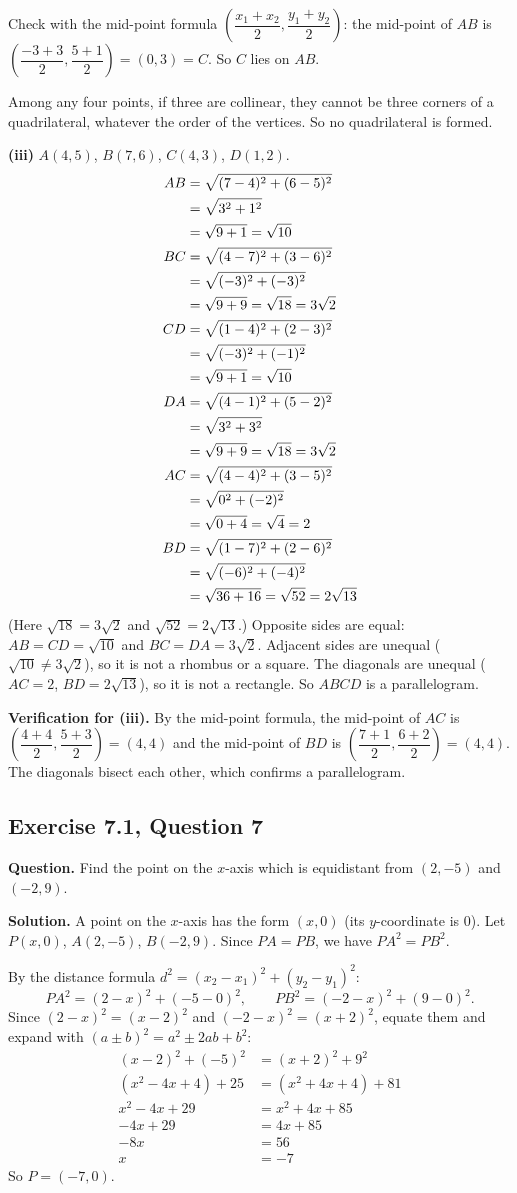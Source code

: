 Check with the mid-point formula $\left(\dfrac{x_1+x_2}{2},\dfrac{y_1+y_2}{2}\right)$: the mid-point of $AB$ is $\left(\dfrac{-3+3}{2},\dfrac{5+1}{2}\right)=(0,3)=C$. So $C$ lies on $AB$.

Among any four points, if three are collinear, they cannot be three corners of a quadrilateral, whatever the order of the vertices. So no quadrilateral is formed.

\textbf{(iii)} $A(4,5)$, $B(7,6)$, $C(4,3)$, $D(1,2)$.
\begin{align*}
\distn{AB}{4}{5}{7}{6}\\
\dist{BC}{7}{6}{4}{3}{3\sqrt2}\\
\distn{CD}{4}{3}{1}{2}\\
\dist{DA}{1}{2}{4}{5}{3\sqrt2}\\
\dist{AC}{4}{5}{4}{3}{2}\\
\dist{BD}{7}{6}{1}{2}{2\sqrt{13}}
\end{align*}
(Here $\sqrt{18}=3\sqrt2$ and $\sqrt{52}=2\sqrt{13}$.) Opposite sides are equal: $AB=CD=\sqrt{10}$ and $BC=DA=3\sqrt2$. Adjacent sides are unequal ($\sqrt{10}\neq3\sqrt2$), so it is not a rhombus or a square. The diagonals are unequal ($AC=2$, $BD=2\sqrt{13}$), so it is not a rectangle. So $ABCD$ is a parallelogram.

\textbf{Verification for (iii).} By the mid-point formula, the mid-point of $AC$ is $\left(\dfrac{4+4}{2},\dfrac{5+3}{2}\right)=(4,4)$ and the mid-point of $BD$ is $\left(\dfrac{7+1}{2},\dfrac{6+2}{2}\right)=(4,4)$. The diagonals bisect each other, which confirms a parallelogram.


\subsection*{Exercise 7.1, Question 7}
\textbf{Question.} Find the point on the $x$-axis which is equidistant from $(2,-5)$ and $(-2,9)$.

\textbf{Solution.} A point on the $x$-axis has the form $(x,0)$ (its $y$-coordinate is $0$). Let $P(x,0)$, $A(2,-5)$, $B(-2,9)$. Since $PA=PB$, we have $PA^2=PB^2$.

By the distance formula $d^2=(x_2-x_1)^2+(y_2-y_1)^2$:
\[
PA^2=(2-x)^2+(-5-0)^2,\qquad PB^2=(-2-x)^2+(9-0)^2 .
\]
Since $(2-x)^2=(x-2)^2$ and $(-2-x)^2=(x+2)^2$, equate them and expand with $(a\pm b)^2=a^2\pm2ab+b^2$:
\begin{align*}
(x-2)^2+(-5)^2&=(x+2)^2+9^2\\
(x^2-4x+4)+25&=(x^2+4x+4)+81\\
x^2-4x+29&=x^2+4x+85\\
-4x+29&=4x+85\\
-8x&=56\\
x&=-7
\end{align*}
So $P=(-7,0)$.

